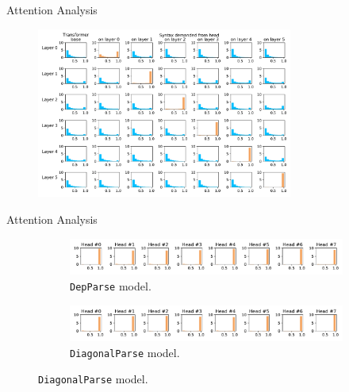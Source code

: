 \documentclass{beamer}
\def\DiagonalParse{\texttt{DiagonalParse}\xspace}
\def\DepParse{\texttt{DepParse}\xspace}
\begin{document}
\begin{frame}{Attention Analysis}
    \begin{figure}[t]
	\includegraphics[width=0.75\textwidth]{img/att_dist}
\end{figure}
\end{frame}


\begin{frame}{Attention Analysis}
\begin{figure}[t]
    \centering
    \begin{subfigure}[b]{\textwidth}
	    \includegraphics[width=\textwidth]{img/att_dist_4.pdf}
        \caption{\DepParse model.}
        \label{fig:att_dist_4_dep}
    \end{subfigure}
    \par\medskip
    \begin{subfigure}[b]{\textwidth}
	    \includegraphics[width=\textwidth]{img/mono_att_dist_4.pdf}
        \caption{\DiagonalParse model.}
        \label{fig:att_dist_4_mono}
    \end{subfigure}
\end{figure}
\end{frame}
\end{document}
